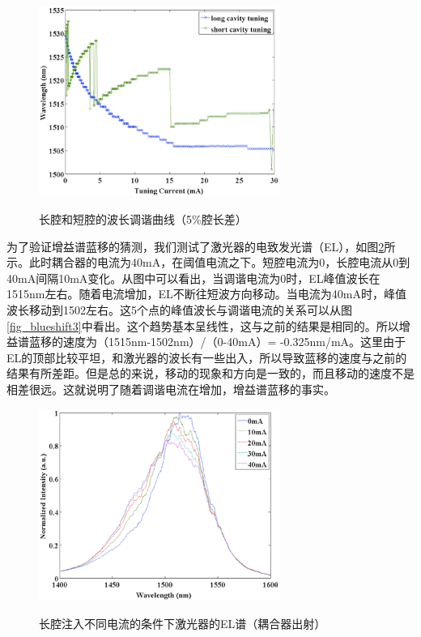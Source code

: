 \documentclass{ZJUthesis}
\begin{document}
\begin{figure}[!ht]
  \centering
  \includegraphics[width=0.7\textwidth]{./Pictures/blueshift.eps}\\
  \caption{长腔和短腔的波长调谐曲线（5\%腔长差）}
  \label{fig_blueshift}
\end{figure}

为了验证增益谱蓝移的猜测，我们测试了激光器的电致发光谱（EL），如图\ref{fig_blueshift2}所示。此时耦合器的电流为40mA，在阈值电流之下。短腔电流为0，长腔电流从0到40mA间隔10mA变化。从图中可以看出，当调谐电流为0时，EL峰值波长在1515nm左右。随着电流增加，EL不断往短波方向移动。当电流为40mA时，峰值波长移动到1502左右。这5个点的峰值波长与调谐电流的关系可以从图\ref{fig_blueshift3}中看出。这个趋势基本呈线性，这与之前的结果是相同的。所以增益谱蓝移的速度为（1515nm-1502nm）/（0-40mA）= -0.325nm/mA。这里由于EL的顶部比较平坦，和激光器的波长有一些出入，所以导致蓝移的速度与之前的结果有所差距。但是总的来说，移动的现象和方向是一致的，而且移动的速度不是相差很远。这就说明了随着调谐电流在增加，增益谱蓝移的事实。

\begin{figure}[!ht]
  \centering
  \includegraphics[width=0.7\textwidth]{./Pictures/blueshift2.eps}\\
  \caption{长腔注入不同电流的条件下激光器的EL谱（耦合器出射）}
  \label{fig_blueshift2}
\end{figure}
\end{document}
